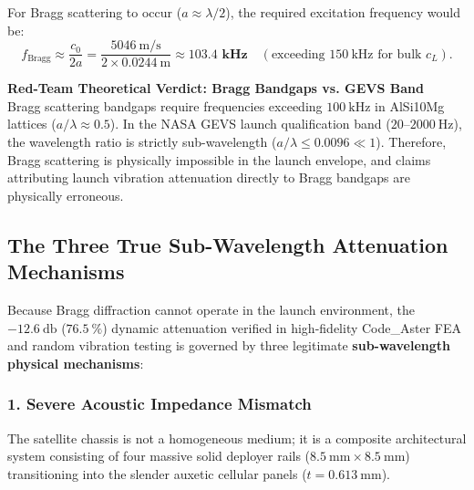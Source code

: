 For Bragg scattering to occur ($a \approx \lambda / 2$), the required excitation frequency would be:
\begin{equation}
f_{\text{Bragg}} \approx \frac{c_0}{2 a} = \frac{\SI{5046}{\meter\per\second}}{2 \times \SI{0.0244}{\meter}} \approx \mathbf{103.4\text{ kHz}} \quad (\text{exceeding } \SI{150}{\kilo\hertz} \text{ for bulk } c_L).
\label{eq:bragg_frequency}
\end{equation}

\begin{svgraybox}
\textbf{Red-Team Theoretical Verdict: Bragg Bandgaps vs. GEVS Band} \\
Bragg scattering bandgaps require frequencies exceeding $\SI{100}{\kilo\hertz}$ in AlSi10Mg lattices ($a/\lambda \approx 0.5$). In the NASA GEVS launch qualification band ($20\text{--}\SI{2000}{\hertz}$), the wavelength ratio is strictly sub-wavelength ($a/\lambda \le 0.0096 \ll 1$). Therefore, Bragg scattering is physically impossible in the launch envelope, and claims attributing launch vibration attenuation directly to Bragg bandgaps are physically erroneous.
\end{svgraybox}

\subsection{The Three True Sub-Wavelength Attenuation Mechanisms}
\label{subsec:three_mechanisms}

Because Bragg diffraction cannot operate in the launch environment, the $\SI{-12.6}{\decibel}$ ($\SI{76.5}{\percent}$) dynamic attenuation verified in high-fidelity Code\_Aster FEA and random vibration testing is governed by three legitimate \textbf{sub-wavelength physical mechanisms}:

\subsubsection{1. Severe Acoustic Impedance Mismatch}
The satellite chassis is not a homogeneous medium; it is a composite architectural system consisting of four massive solid deployer rails ($\SI{8.5}{\milli\meter} \times \SI{8.5}{\milli\meter}$) transitioning into the slender auxetic cellular panels ($t = \SI{0.613}{\milli\meter}$).


